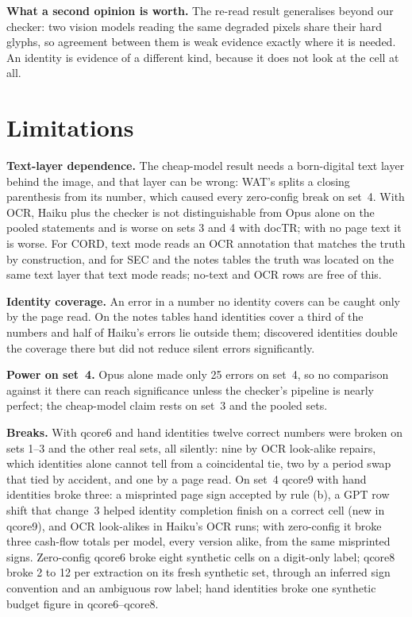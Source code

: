 \documentclass[10pt,twocolumn]{article}
\newcommand{\vq}[1]{\textsf{qcore#1}}
\begin{document}
\textbf{What a second opinion is worth.} The re-read result generalises beyond our checker: two vision models reading the same degraded pixels share their hard glyphs, so agreement between them is weak evidence exactly where it is needed. An identity is evidence of a different kind, because it does not look at the cell at all.

\section{Limitations}

\textbf{Text-layer dependence.} The cheap-model result needs a born-digital text layer behind the image, and that layer can be wrong: WAT's splits a closing parenthesis from its number, which caused every zero-config break on set~4. With OCR, Haiku plus the checker is not distinguishable from Opus alone on the pooled statements and is worse on sets 3 and 4 with docTR; with no page text it is worse. For CORD, text mode reads an OCR annotation that matches the truth by construction, and for SEC and the notes tables the truth was located on the same text layer that text mode reads; no-text and OCR rows are free of this.

\textbf{Identity coverage.} An error in a number no identity covers can be caught only by the page read. On the notes tables hand identities cover a third of the numbers and half of Haiku's errors lie outside them; discovered identities double the coverage there but did not reduce silent errors significantly.

\textbf{Power on set~4.} Opus alone made only 25 errors on set~4, so no comparison against it there can reach significance unless the checker's pipeline is nearly perfect; the cheap-model claim rests on set~3 and the pooled sets.

\textbf{Breaks.} With \vq{6} and hand identities twelve correct numbers were broken on sets 1--3 and the other real sets, all silently: nine by OCR look-alike repairs, which identities alone cannot tell from a coincidental tie, two by a period swap that tied by accident, and one by a page read. On set~4 \vq{9} with hand identities broke three: a misprinted page sign accepted by rule (b), a GPT row shift that change~3 helped identity completion finish on a correct cell (new in \vq{9}), and OCR look-alikes in Haiku's OCR runs; with zero-config it broke three cash-flow totals per model, every version alike, from the same misprinted signs. Zero-config \vq{6} broke eight synthetic cells on a digit-only label; \vq{8} broke 2 to 12 per extraction on its fresh synthetic set, through an inferred sign convention and an ambiguous row label; hand identities broke one synthetic budget figure in \vq{6}--\vq{8}.
\end{document}
